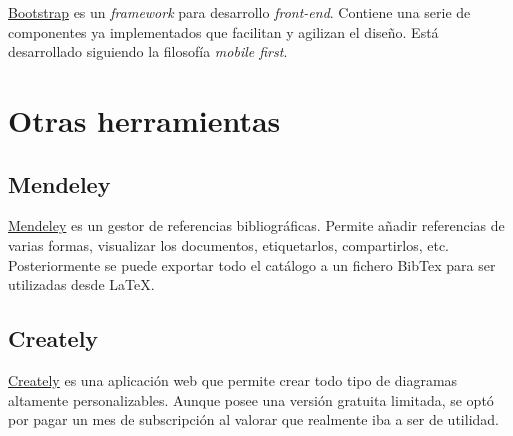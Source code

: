 \href{http://getbootstrap.com/}{Bootstrap} es un \emph{framework} para
desarrollo \emph{front-end}. Contiene una serie de componentes ya
implementados que facilitan y agilizan el diseño. Está desarrollado
siguiendo la filosofía \emph{mobile first}.

\section{Otras herramientas}\label{otras-herramientas}

\subsection{Mendeley}\label{mendeley}

\href{https://www.mendeley.com/}{Mendeley} es un gestor de referencias
bibliográficas. Permite añadir referencias de varias formas, visualizar
los documentos, etiquetarlos, compartirlos, etc. Posteriormente se puede
exportar todo el catálogo a un fichero BibTex para ser utilizadas desde
\LaTeX.

\subsection{Creately}\label{creately}

\href{https://creately.com/}{Creately} es una aplicación web que permite
crear todo tipo de diagramas altamente personalizables. Aunque posee una
versión gratuita limitada, se optó por pagar un mes de subscripción al
valorar que realmente iba a ser de utilidad.
